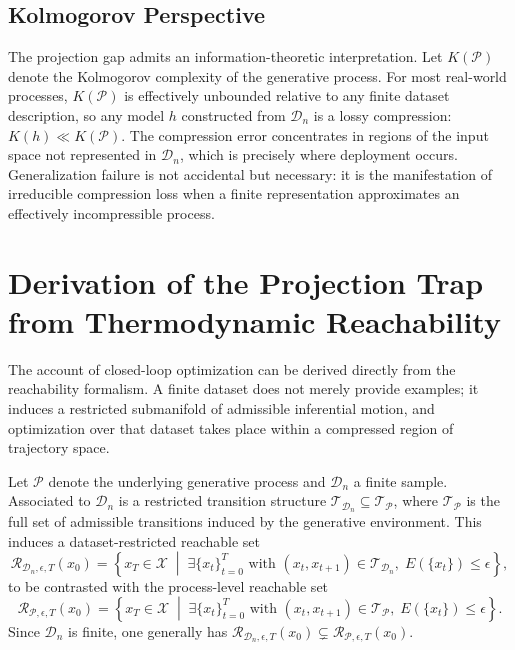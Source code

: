 \documentclass[12pt]{article}
\theoremstyle{plain}
\theoremstyle{definition}
\theoremstyle{remark}
\begin{document}
\subsection{Kolmogorov Perspective}

The projection gap admits an information-theoretic interpretation. Let $K(\mathcal{P})$ denote the Kolmogorov complexity of the generative process. For most real-world processes, $K(\mathcal{P})$ is effectively unbounded relative to any finite dataset description, so any model $h$ constructed from $\mathcal{D}_n$ is a lossy compression: $K(h) \ll K(\mathcal{P})$. The compression error concentrates in regions of the input space not represented in $\mathcal{D}_n$, which is precisely where deployment occurs. Generalization failure is not accidental but necessary: it is the manifestation of irreducible compression loss when a finite representation approximates an effectively incompressible process.

\section{Derivation of the Projection Trap from Thermodynamic Reachability}

The account of closed-loop optimization can be derived directly from the reachability formalism. A finite dataset does not merely provide examples; it induces a restricted submanifold of admissible inferential motion, and optimization over that dataset takes place within a compressed region of trajectory space.

Let $\mathcal{P}$ denote the underlying generative process and $\mathcal{D}_n$ a finite sample. Associated to $\mathcal{D}_n$ is a restricted transition structure $\mathcal{T}_{\mathcal{D}_n} \subseteq \mathcal{T}_{\mathcal{P}}$, where $\mathcal{T}_{\mathcal{P}}$ is the full set of admissible transitions induced by the generative environment. This induces a dataset-restricted reachable set
\[
\mathcal{R}_{\mathcal{D}_n,\epsilon,T}(x_0) = \left\{ x_T \in \mathcal{X} \;\middle|\; \exists \{x_t\}_{t=0}^T \text{ with } (x_t,x_{t+1}) \in \mathcal{T}_{\mathcal{D}_n},\; E(\{x_t\}) \le \epsilon \right\},
\]
to be contrasted with the process-level reachable set
\[
\mathcal{R}_{\mathcal{P},\epsilon,T}(x_0) = \left\{ x_T \in \mathcal{X} \;\middle|\; \exists \{x_t\}_{t=0}^T \text{ with } (x_t,x_{t+1}) \in \mathcal{T}_{\mathcal{P}},\; E(\{x_t\}) \le \epsilon \right\}.
\]
Since $\mathcal{D}_n$ is finite, one generally has $\mathcal{R}_{\mathcal{D}_n,\epsilon,T}(x_0) \subsetneq \mathcal{R}_{\mathcal{P},\epsilon,T}(x_0)$.
\end{document}
